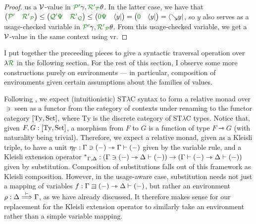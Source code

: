 \begin{proof}
  us a $\mathcal V$-value in $\grPprime\gamma, \grR\gr'_\grP\theta$.
  In the latter case, we have that
  $\begin{pmatrix} \grPprime & \grR\gr'_\grP \end{pmatrix}
  \leq \begin{pmatrix} \grQprime\gr\Psi & \grR\gr'_\grQ \end{pmatrix}
  \leq \begin{pmatrix} \gr0\gr\Psi & \langle y \rvert \end{pmatrix}
  = \begin{pmatrix} \gr0 & \langle y \rvert \end{pmatrix}
  = \left\langle {\searrow}y \right\rvert$, so $y$ also serves as a
  usage-checked variable in $\grPprime\gamma, \grR\gr'_\grP\theta$.
  From this usage-checked variable, we get a $\mathcal V$-value in the same context
  using $\mathrm{vr}$.
\end{proof}

I put together the preceeding pieces to give a syntactic traversal operation over
$\name$ in the following section.
For the rest of this section, I observe some more constructions purely on
environments --- in particular, composition of environments given certain
assumptions about the families of values.

Following \citet{ACU15}, we expect (intuitionistic) ST$\lambda$C syntax to form
a relative monad over $\ni$ seen as a functor from the category of contexts
under renaming to the functor category $\blr{\mathrm{Ty}, \Set}$, where
$\mathrm{Ty}$ is the discrete category of ST$\lambda$C types.
Notice that, given $F,G : \blr{\mathrm{Ty}, \Set}$, a morphism from $F$ to $G$
is a function of type $F \rightarrowtriangle G$ (with naturality being trivial).
Therefore, we expect a relative monad, given as a Kleisli triple, to have a unit
$\eta_\Gamma : \Gamma \ni \plr{-} \rightarrowtriangle \Gamma \vdash \plr{-}$
given by the variable rule, and a Kleisli extension operator
${^*}_{\Gamma,\Delta} :
\plr{\Gamma \ni \plr{-} \rightarrowtriangle \Delta \vdash \plr{-}} \to
\plr{\Gamma \vdash \plr{-} \rightarrowtriangle \Delta \vdash \plr{-}}$
given by substitution.
Composition of substitutions falls out of this framework as Kleisli composition.
However, in the usage-aware case, substitution needs not just a mapping of
variables $f : \Gamma \sqni \plr{-} \rightarrowtriangle \Delta \vdash \plr{-}$,
but rather an environment $\rho : \Delta \stackrel{\vdash}\Longrightarrow \Gamma$, as we have already
discussed.
It therefore makes sense for our replacement for the Kleisli extension operator
to similarly take an environment rather than a simple variable mapping.

